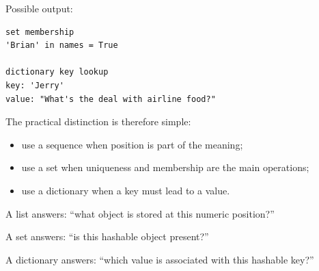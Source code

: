 Possible output:

\begin{verbatim}
set membership
'Brian' in names = True

dictionary key lookup
key: 'Jerry'
value: "What's the deal with airline food?"
\end{verbatim}

The practical distinction is therefore simple:

\begin{itemize}
    \item use a sequence when position is part of the meaning;
    \item use a set when uniqueness and membership are the main operations;
    \item use a dictionary when a key must lead to a value.
\end{itemize}

A list answers: ``what object is stored at this numeric position?''

A set answers: ``is this hashable object present?''

A dictionary answers: ``which value is associated with this hashable key?''